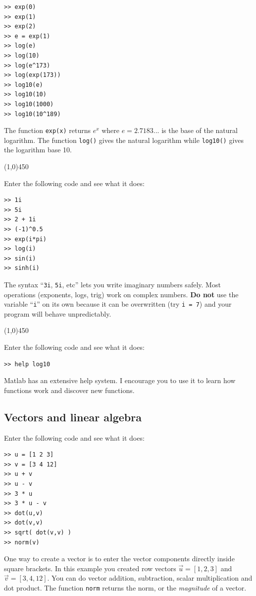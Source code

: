 \documentclass[12pt,a4paper]{article}   %
\newcommand{\code}[1]{\texttt{#1}}
\newcommand{\ruler}{
  \begin{center}
    \line(1,0){450}
  \end{center}
}
\begin{document}
\begin{verbatim}
>> exp(0)
>> exp(1)
>> exp(2)
>> e = exp(1)
>> log(e)
>> log(10)
>> log(e^173)
>> log(exp(173))
>> log10(e)
>> log10(10)
>> log10(1000)
>> log10(10^189)
\end{verbatim}

The function \code{exp(x)} returns $e^x$ where $e = 2.7183...$ is the base of the
natural logarithm. The function \texttt{log()} gives the natural logarithm
while \code{log10()} gives the logarithm base 10.

\ruler

Enter the following code and see what it does:

\begin{verbatim}
>> 1i
>> 5i
>> 2 + 1i
>> (-1)^0.5
>> exp(i*pi)
>> log(i)
>> sin(i)
>> sinh(i)
\end{verbatim}

The syntax ``\code{3i}, \code{5i}, etc'' lets you write imaginary numbers safely. Most
operations (exponents, logs, trig) work on complex numbers. \textbf{Do not} use
the variable ``\code{i}'' on its own because it can be overwritten (try \code{i = 7}) and
your program will behave unpredictably.

\ruler

Enter the following code and see what it does:

\begin{verbatim}
>> help log10
\end{verbatim}

Matlab has an extensive help system. I encourage you to use it to learn how functions
work and discover new functions.

\subsection{Vectors and linear algebra}

Enter the following code and see what it does:

\begin{verbatim}
>> u = [1 2 3]
>> v = [3 4 12]
>> u + v
>> u - v
>> 3 * u
>> 3 * u - v
>> dot(u,v)
>> dot(v,v)
>> sqrt( dot(v,v) )
>> norm(v)
\end{verbatim}

One way to create a vector is to enter the vector components directly inside square brackets.
In this example you created row vectors $\vec{u} = [1,2,3]$ and $\vec{v} = [3,4,12]$. You can
do vector addition, subtraction, scalar multiplication and dot product. The function \code{norm} 
returns the norm, or the \textit{magnitude} of a vector.
\end{document}
